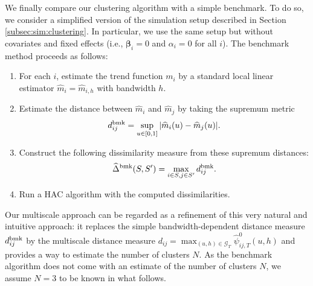 \documentclass[12pt]{article}
\begin{document}
We finally compare our clustering algorithm with a simple benchmark. To do so, we consider a simplified version of the simulation setup described in Section \ref{subsec:sim:clustering}. In particular, we use the same setup but without covariates and fixed effects (i.e., $\boldsymbol{\beta}_i = 0$ and $\alpha_i = 0$ for all $i$). The benchmark method proceeds as follows: 
\begin{enumerate}[label=\textit{Step \arabic*}.,leftmargin=1.5cm,itemsep=0pt,parsep=0pt,topsep=3pt]
\item For each $i$, estimate the trend function $m_i$ by a standard local linear estimator $\widehat{m}_i = \widehat{m}_{i,h}$ with bandwidth $h$.
\item Estimate the distance between $\widehat{m}_i$ and $\widehat{m}_j$ by taking the supremum metric 
\[ d_{ij}^{\textnormal{bmk}} = \sup_{u \in [0,1]} |\widehat{m}_i(u) - \widehat{m}_j(u)|. \]
\item Construct the following dissimilarity measure from these supremum distances:
\[ \widehat{\Delta}^{\textnormal{bmk}}(S,S') = \max_{i \in S,j \in S'} d_{ij}^{\textnormal{bmk}}. \]
\item Run a HAC algorithm with the computed dissimilarities. 
\end{enumerate}
Our multiscale approach can be regarded as a refinement of this very natural and intuitive approach: it replaces the simple bandwidth-dependent distance measure $d_{ij}^{\textnormal{bmk}}$ by the multiscale distance measure $d_{ij} = \max_{(u, h) \in \mathcal{G}_T}\hat{\psi}^0_{ij, T}(u, h)$ and provides a way to estimate the number of clusters $N$. As the benchmark algorithm does not come with an estimate of the number of clusters $N$, we assume $N=3$ to be known in what follows. 

\end{document}
